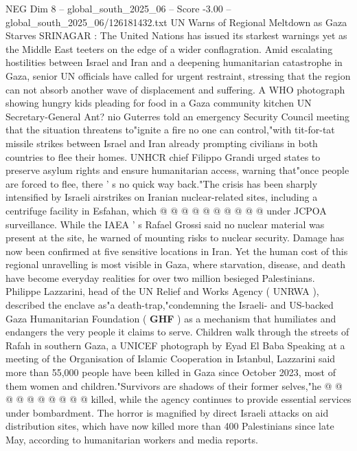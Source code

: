 \begin{textsample}{NEG Dim 8 – global\_south\_2025\_06 – Score -3.00 – global\_south\_2025\_06/126181432.txt}  \label{ex:f8_neg_031}
UN Warns of Regional Meltdown as Gaza Starves SRINAGAR : The United Nations has issued its starkest warnings yet as the Middle East teeters on the edge of a wider conflagration.
Amid escalating hostilities between Israel and Iran and a deepening humanitarian catastrophe in Gaza, senior UN officials have called for urgent restraint, stressing that the region can not absorb another wave of displacement and suffering.
A WHO photograph showing hungry kids pleading for food in a Gaza community kitchen UN Secretary-General Ant? nio Guterres told an emergency Security Council meeting that the situation threatens to"ignite a fire no one can control,"with tit-for-tat missile strikes between Israel and Iran already prompting civilians in both countries to flee their homes.
UNHCR chief Filippo Grandi urged states to preserve asylum rights and ensure humanitarian access, warning that"once people are forced to flee, there ' s no quick way back."The crisis has been sharply intensified by Israeli airstrikes on Iranian nuclear-related sites, including a centrifuge facility in Esfahan, which @ @ @ @ @ @ @ @ @ @ under JCPOA surveillance.
While the IAEA ' s Rafael Grossi said no nuclear material was present at the site, he warned of mounting risks to nuclear security.
Damage has now been confirmed at five sensitive locations in Iran.
Yet the human cost of this regional unravelling is most visible in Gaza, where starvation, disease, and death have become everyday realities for over two million besieged Palestinians.
Philippe Lazzarini, head of the UN Relief and Works Agency ( UNRWA ), described the enclave as"a death-trap,"condemning the Israeli- and US-backed Gaza Humanitarian Foundation ( \textbf{GHF} ) as a mechanism that humiliates and endangers the very people it claims to serve.
Children walk through the streets of Rafah in southern Gaza, a UNICEF photograph by Eyad El Baba Speaking at a meeting of the Organisation of Islamic Cooperation in Istanbul, Lazzarini said more than 55,000 people have been killed in Gaza since October 2023, most of them women and children."Survivors are shadows of their former selves,"he @ @ @ @ @ @ @ @ @ @ killed, while the agency continues to provide essential services under bombardment.
The horror is magnified by direct Israeli attacks on aid distribution sites, which have now killed more than 400 Palestinians since late May, according to humanitarian workers and media reports.

\end{textsample}
